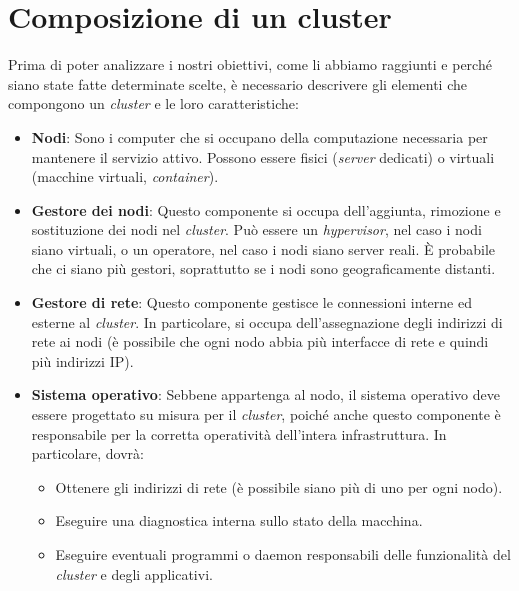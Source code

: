 
\section{Composizione di un cluster}
Prima di poter analizzare i nostri obiettivi, come li abbiamo raggiunti e perché siano state fatte determinate scelte, è necessario descrivere gli elementi che compongono un \textit{cluster} e le loro caratteristiche:

\begin{itemize}
  \item \textbf{Nodi}: Sono i computer che si occupano della computazione necessaria per mantenere il servizio attivo. Possono essere fisici (\textit{server} dedicati) o virtuali (macchine virtuali, \textit{container}).
  \item \textbf{Gestore dei nodi}: Questo componente si occupa dell'aggiunta, rimozione e sostituzione dei nodi nel \textit{cluster}. Può essere un \textit{hypervisor}, nel caso i nodi siano virtuali, o un operatore, nel caso i nodi siano server reali. È probabile che ci siano più gestori, soprattutto se i nodi sono geograficamente distanti.
  \item \textbf{Gestore di rete}: Questo componente gestisce le connessioni interne ed esterne al \textit{cluster}. In particolare, si occupa dell'assegnazione degli indirizzi di rete ai nodi (è possibile che ogni nodo abbia più interfacce di rete e quindi più indirizzi IP).
  \item \textbf{Sistema operativo}: Sebbene appartenga al nodo, il sistema operativo deve essere progettato su misura per il \textit{cluster}, poiché anche questo componente è responsabile per la corretta operatività dell'intera infrastruttura. In particolare, dovrà:
    \begin{itemize}
        \item Ottenere gli indirizzi di rete (è possibile siano più di uno per ogni nodo).
        \item Eseguire una diagnostica interna sullo stato della macchina.
        \item Eseguire eventuali programmi o daemon responsabili delle funzionalità del \textit{cluster} e degli applicativi.
    \end{itemize}
\end{itemize}
